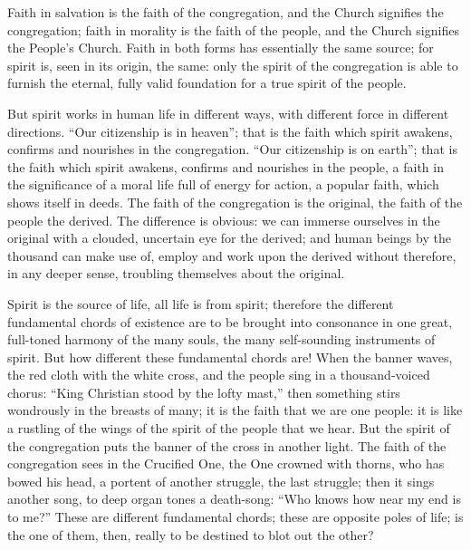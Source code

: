 \documentclass[12pt,a4paper,openany]{book}
\newcommand{\opage}[1]{\marginnote{\footnotesize\textit{[#1]}}}
\begin{document}
Faith in salvation is the faith of the congregation, and the Church signifies
the congregation; faith in morality is the faith of the people, and
the Church signifies the People's Church. Faith in both forms
has essentially the same source; for spirit is, seen in its origin,
the same: only the spirit of the congregation is able to
furnish the eternal, fully valid foundation for a true
spirit of the people.

But spirit works in human life in different
ways, with different force in different directions.
``Our citizenship is in heaven''; that is the faith which
spirit awakens, confirms and nourishes in the congregation.
``Our citizenship is on earth''; that is the faith which
spirit awakens, confirms and nourishes in the people, a faith
in the significance of a moral life full of energy for action, a popular
faith, which shows itself in deeds. The faith of the congregation
\setcounter{footnote}{0}%
\opage{104}is the original, the faith of the people the derived. The difference
is obvious: we can immerse ourselves in the
original with a clouded, uncertain eye for the derived;
and human beings by the thousand can make use of, employ and work upon
the derived without therefore, in any deeper sense,
troubling themselves about the original.

Spirit is the source of life, all life is from spirit;
therefore the different fundamental chords of existence
are to be brought into consonance in one great, full-toned harmony
of the many souls, the many self-sounding instruments of spirit.
But how different these fundamental chords are!
When the banner waves, the red cloth with
the white cross, and the people sing in a thousand-voiced
chorus: ``King Christian stood by the lofty mast,'' then
something stirs wondrously in the breasts of many; it is the faith
that we are one people: it is like a rustling of the wings of
the spirit of the people that we hear. But the spirit of the congregation
puts the banner of the cross in another light. The faith of the congregation
sees in the Crucified One, the One crowned with thorns, who has
bowed his head, a portent of another struggle, the last
struggle; then it sings another song, to deep organ tones
a death-song: ``Who knows how near my end
is to me?'' These are different fundamental chords; these are
opposite poles of life; is the one of them, then, really
to be destined to blot out the other?
\end{document}
